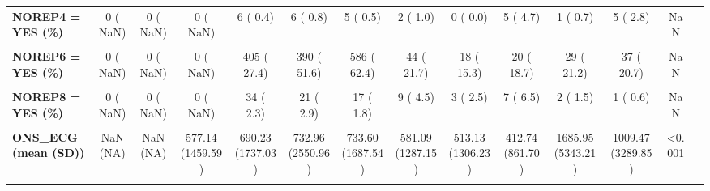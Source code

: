 \documentclass[
]{article}
\begin{document}
\begin{table}[H]
\begin{tabular}[t]{>{\raggedright\arraybackslash}p{5em}ccccccccccccc}
\textbf{NOREP4 = YES (\%)} & 0 (  NaN) & 0 (  NaN) & 0 (  NaN) & 6 (  0.4) & 6 (  0.8) & 5 (  0.5) & 2 (  1.0) & 0 (  0.0) & 5 (  4.7) & 1 (  0.7) & 5 (  2.8) & NaN & \\
\textbf{\cellcolor{gray!10}{NOREP5 = YES (\%)}} & \cellcolor{gray!10}{0 (  NaN)} & \cellcolor{gray!10}{0 (  NaN)} & \cellcolor{gray!10}{0 (  NaN)} & \cellcolor{gray!10}{7 (  0.5)} & \cellcolor{gray!10}{19 (  2.6)} & \cellcolor{gray!10}{8 (  0.9)} & \cellcolor{gray!10}{0 (  NaN)} & \cellcolor{gray!10}{0 (  NaN)} & \cellcolor{gray!10}{0 (  NaN)} & \cellcolor{gray!10}{0 (  NaN)} & \cellcolor{gray!10}{0 (  NaN)} & \cellcolor{gray!10}{NaN} & \cellcolor{gray!10}{}\\
\textbf{NOREP6 = YES (\%)} & 0 (  NaN) & 0 (  NaN) & 0 (  NaN) & 405 ( 27.4) & 390 ( 51.6) & 586 ( 62.4) & 44 ( 21.7) & 18 ( 15.3) & 20 ( 18.7) & 29 ( 21.2) & 37 ( 20.7) & NaN & \\
\textbf{\cellcolor{gray!10}{NOREP7 = YES (\%)}} & \cellcolor{gray!10}{0 (  NaN)} & \cellcolor{gray!10}{0 (  NaN)} & \cellcolor{gray!10}{0 (  NaN)} & \cellcolor{gray!10}{4 (  0.3)} & \cellcolor{gray!10}{3 (  0.4)} & \cellcolor{gray!10}{3 (  0.3)} & \cellcolor{gray!10}{1 (  0.5)} & \cellcolor{gray!10}{0 (  0.0)} & \cellcolor{gray!10}{0 (  0.0)} & \cellcolor{gray!10}{2 (  1.5)} & \cellcolor{gray!10}{0 (  0.0)} & \cellcolor{gray!10}{NaN} & \cellcolor{gray!10}{}\\
\textbf{NOREP8 = YES (\%)} & 0 (  NaN) & 0 (  NaN) & 0 (  NaN) & 34 (  2.3) & 21 (  2.9) & 17 (  1.8) & 9 (  4.5) & 3 (  2.5) & 7 (  6.5) & 2 (  1.5) & 1 (  0.6) & NaN & \\
\textbf{\cellcolor{gray!10}{ONLYANG = YES (\%)}} & \cellcolor{gray!10}{266 ( 25.4)} & \cellcolor{gray!10}{280 ( 19.9)} & \cellcolor{gray!10}{286 ( 18.1)} & \cellcolor{gray!10}{326 ( 19.3)} & \cellcolor{gray!10}{270 ( 17.7)} & \cellcolor{gray!10}{298 ( 18.7)} & \cellcolor{gray!10}{284 ( 16.9)} & \cellcolor{gray!10}{324 ( 19.4)} & \cellcolor{gray!10}{463 ( 26.0)} & \cellcolor{gray!10}{159 (  9.1)} & \cellcolor{gray!10}{165 (  9.4)} & \cellcolor{gray!10}{<0.001} & \cellcolor{gray!10}{}\\
\textbf{ONS\_ECG (mean (SD))} & NaN (NA) & NaN (NA) & 577.14 (1459.59) & 690.23 (1737.03) & 732.96 (2550.96) & 733.60 (1687.54) & 581.09 (1287.15) & 513.13 (1306.23) & 412.74 (861.70) & 1685.95 (5343.21) & 1009.47 (3289.85) & <0.001 & \\
\textbf{\cellcolor{gray!10}{ONS\_PCI (mean (SD))}} & \cellcolor{gray!10}{227.05 (162.32)} & \cellcolor{gray!10}{551.85 (1290.88)} & \cellcolor{gray!10}{420.48 (556.15)} & \cellcolor{gray!10}{362.29 (641.05)} & \cellcolor{gray!10}{358.50 (521.02)} & \cellcolor{gray!10}{276.54 (342.10)} & \cellcolor{gray!10}{316.93 (338.83)} & \cellcolor{gray!10}{274.08 (334.49)} & \cellcolor{gray!10}{281.20 (329.91)} & \cellcolor{gray!10}{845.90 (2605.22)} & \cellcolor{gray!10}{482.87 (1051.98)} & \cellcolor{gray!10}{<0.001} & \cellcolor{gray!10}{}\\

\end{tabular}
\end{table}
\end{document}

